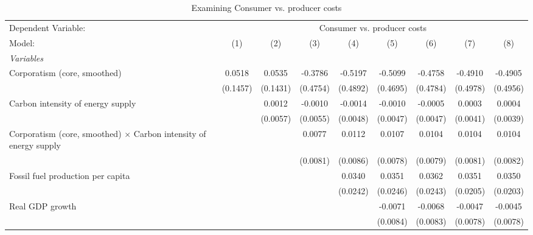 
\begin{table}[htbp]
   \caption{Examining Consumer vs. producer costs}
   \centering
   \begin{tabular}{lcccccccc}
      \tabularnewline \midrule \midrule
      Dependent Variable: & \multicolumn{8}{c}{Consumer vs. producer costs}\\
      Model:                                                                   & (1)      & (2)      & (3)      & (4)      & (5)      & (6)      & (7)      & (8)\\  
      \midrule
      \emph{Variables}\\
      Corporatism (core, smoothed)                                             & 0.0518   & 0.0535   & -0.3786  & -0.5197  & -0.5099  & -0.4758  & -0.4910  & -0.4905\\   
                                                                               & (0.1457) & (0.1431) & (0.4754) & (0.4892) & (0.4695) & (0.4784) & (0.4978) & (0.4956)\\   
      Carbon intensity of energy supply                                        &          & 0.0012   & -0.0010  & -0.0014  & -0.0010  & -0.0005  & 0.0003   & 0.0004\\   
                                                                               &          & (0.0057) & (0.0055) & (0.0048) & (0.0047) & (0.0047) & (0.0041) & (0.0039)\\   
      Corporatism (core, smoothed) $\times$ Carbon intensity of energy supply  &          &          & 0.0077   & 0.0112   & 0.0107   & 0.0104   & 0.0104   & 0.0104\\   
                                                                               &          &          & (0.0081) & (0.0086) & (0.0078) & (0.0079) & (0.0081) & (0.0082)\\   
      Fossil fuel production per capita                                        &          &          &          & 0.0340   & 0.0351   & 0.0362   & 0.0351   & 0.0350\\   
                                                                               &          &          &          & (0.0242) & (0.0246) & (0.0243) & (0.0205) & (0.0203)\\   
      Real GDP growth                                                          &          &          &          &          & -0.0071  & -0.0068  & -0.0047  & -0.0045\\   
                                                                               &          &          &          &          & (0.0084) & (0.0083) & (0.0078) & (0.0078)\\   

\end{tabular}
\end{table}
